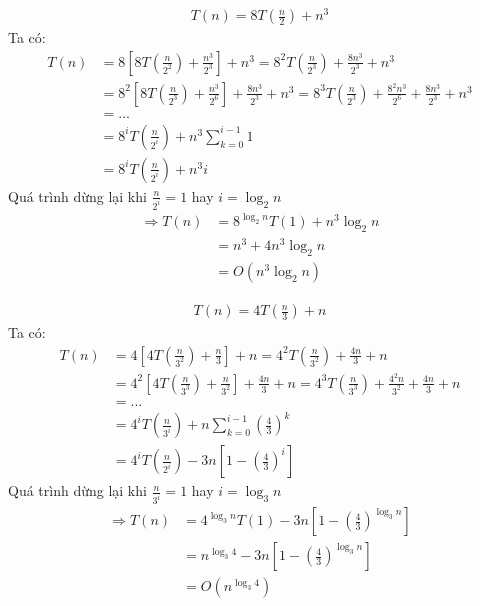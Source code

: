 \documentclass[12pt, a4paper, fleqn]{article}
\begin{document}
\begin{align*}
T(n) = 8T\left(\frac{n}{2}\right) + n ^ 3
\end{align*}
Ta có:
\begin{align*}
T(n) &= 8\left[8T\left(\frac{n}{2^2}\right)+\frac{n^3}{2^3}\right]+n^3=8^2T\left(\frac{n}{2^3}\right)+\frac{8n^3}{2^3}+n^3\\
	 &=8^2\left[8T\left(\frac{n}{2^3}\right)+\frac{n^3}{2^6}\right]+\frac{8n^3}{2^3}+n^3=8^3T\left(\frac{n}{2^3}\right)+\frac{8^2n^3}{2^6}+\frac{8n^3}{2^3}+n^3\\
	 &=...\\
	 &=8^iT\left(\frac{n}{2^i}\right)+n^3{\sum_{k=0}^{i-1}1}\\
	 &=8^iT\left(\frac{n}{2^i}\right)+n^3i
\end{align*}
Quá trình dừng lại khi $\displaystyle \frac{n}{2 ^ i} = 1$ hay $i = \log_{2}{n}$
\setlength{\abovedisplayskip}{3pt}%
\setlength{\belowdisplayskip}{3pt}%
\begin{align*}
\Rightarrow T(n) &= 8^{\log_{2}{n}}T(1)+n^3\log_{2}{n}\\
&= n^3+4n^3\log_{2}{n}\\
&= O\left(n^3\log_{2}{n}\right)
\end{align*}

\begin{align*}
T(n) = 4T\left(\frac{n}{3}\right) + n
\end{align*}
Ta có:
\begin{align*}
T(n) &= 4\left[4T\left(\frac{n}{3^2}\right)+\frac{n}{3}\right]+n=4^2T\left(\frac{n}{3^2}\right)+\frac{4n}{3}+n\\
&=4^2\left[4T\left(\frac{n}{3^3}\right)+\frac{n}{3^2}\right]+\frac{4n}{3}+n=4^3T\left(\frac{n}{3^3}\right)+\frac{4^2n}{3^2}+\frac{4n}{3}+n\\
&=...\\
&=4^iT\left(\frac{n}{3^i}\right)+n\sum_{k=0}^{i-1}\left({\frac{4}{3}}\right)^k\\
&=4^iT\left(\frac{n}{2^i}\right)-3n\left[1-\left(\frac{4}{3}\right)^i\right]
\end{align*}
Quá trình dừng lại khi $\displaystyle \frac{n}{3 ^ i} = 1$ hay $i = \log_{3}{n}$
\setlength{\abovedisplayskip}{3pt}%
\setlength{\belowdisplayskip}{3pt}%
\begin{align*}
\Rightarrow T(n) &= 4^{\log_{3}{n}}T(1)-3n\left[1-\left(\frac{4}{3}\right)^{\log_{3}{n}}\right]\\
&= n^{\log_{3}{4}}-3n\left[1-\left(\frac{4}{3}\right)^{\log_{3}{n}}\right]\\
&=O\left(n^{\log_{3}{4}}\right)
\end{align*}
\end{document}
